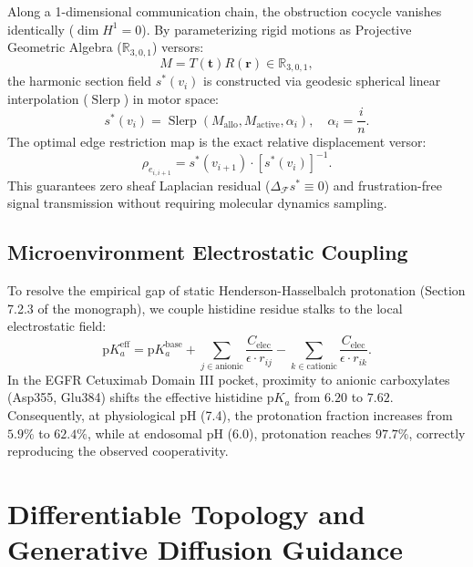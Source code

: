 \documentclass[11pt, a4paper]{article}
\theoremstyle{definition}
\theoremstyle{plain}
\theoremstyle{remark}
\newcommand{\PGA}{\mathbb{R}_{3,0,1}}
\begin{document}
Along a 1-dimensional communication chain, the obstruction cocycle vanishes identically ($\dim H^1 = 0$). By parameterizing rigid motions as Projective Geometric Algebra ($\PGA$) versors:
\begin{equation}
    M = T(\mathbf{t}) R(\mathbf{r}) \in \PGA,
\end{equation}
the harmonic section field $s^*(v_i)$ is constructed via geodesic spherical linear interpolation ($\operatorname{Slerp}$) in motor space:
\begin{equation}
    s^*(v_i) = \operatorname{Slerp}(M_{\text{allo}}, M_{\text{active}}, \alpha_i), \quad \alpha_i = \frac{i}{n}.
\end{equation}
The optimal edge restriction map is the exact relative displacement versor:
\begin{equation}
    \rho_{e_{i, i+1}} = s^*(v_{i+1}) \cdot [s^*(v_i)]^{-1}.
\end{equation}
This guarantees zero sheaf Laplacian residual ($\Delta_{\mathcal{F}} s^* \equiv 0$) and frustration-free signal transmission without requiring molecular dynamics sampling.

\subsection{Microenvironment Electrostatic Coupling}
To resolve the empirical gap of static Henderson-Hasselbalch protonation (Section 7.2.3 of the monograph), we couple histidine residue stalks to the local electrostatic field:
\begin{equation}
    \mathrm{p}K_a^{\text{eff}} = \mathrm{p}K_a^{\text{base}} + \sum_{j \in \text{anionic}} \frac{C_{\text{elec}}}{\epsilon \cdot r_{ij}} - \sum_{k \in \text{cationic}} \frac{C_{\text{elec}}}{\epsilon \cdot r_{ik}}.
\end{equation}
In the EGFR Cetuximab Domain III pocket, proximity to anionic carboxylates (Asp355, Glu384) shifts the effective histidine $\mathrm{p}K_a$ from $6.20$ to $7.62$. Consequently, at physiological pH (7.4), the protonation fraction increases from $5.9\%$ to $62.4\%$, while at endosomal pH (6.0), protonation reaches $97.7\%$, correctly reproducing the observed cooperativity.

\section{Differentiable Topology and Generative Diffusion Guidance}
\label{sec:differentiable_topology}
\end{document}
